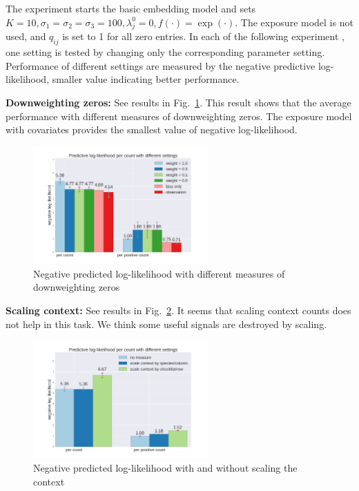 \documentclass{article}
\begin{document}
The experiment starts the basic embedding model and sets $K = 10, \sigma_1 = \sigma_2 = \sigma_3 = 100, \lambda^0_j = 0, 
f(\cdot) = \exp(\cdot)$. The exposure model is not used, and $q_{ij}$ is set to 1 for all zero entries. In each of the following experiment
, one setting is tested by changing only the corresponding parameter setting. Performance of different settings are measured by the negative 
predictive log-likelihood, smaller value indicating better performance.

{\bf Downweighting zeros:} See results in Fig.~\ref{fig_dwz}. This result shows that the average performance with different measures of downweighting zeros. The exposure model with covariates provides the smallest value of negative log-likelihood.

\begin{figure}[t]
    \centering
    \includegraphics[width=0.6\textwidth]{figures/dwz.png}
    \caption{Negative predicted log-likelihood with different measures of downweighting zeros}
    \label{fig_dwz}
\end{figure}


{\bf Scaling context:} See results in Fig.~\ref{fig_scaling}. It seems that scaling context counts does not help in this task. 
We think some useful signals are destroyed by scaling. 

\begin{figure}[t]
    \centering
    \includegraphics[width=0.6\textwidth]{figures/scale_context.png}
    \caption{Negative predicted log-likelihood with and without scaling the context}
    \label{fig_scaling}
\end{figure}
\end{document}
